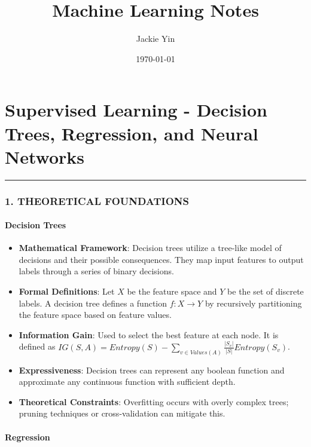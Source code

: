 \documentclass[
  12pt,
]{report}
\title{Machine Learning Notes}
\author{Jackie Yin}
\date{\today}
\providecommand{\tightlist}{%
  \setlength{\itemsep}{0pt}\setlength{\parskip}{0pt}}
\begin{document}
\maketitle

\chapter{Supervised Learning - Decision Trees, Regression, and Neural Networks}

\begin{center}\rule{0.5\linewidth}{0.5pt}\end{center}

\subsection{1. THEORETICAL FOUNDATIONS}\label{theoretical-foundations}

\subsubsection{Decision Trees}\label{decision-trees}

\begin{itemize}
\tightlist
\item
  \textbf{Mathematical Framework}: Decision trees utilize a tree-like model of decisions and their possible consequences. They map input features to output labels through a series of binary decisions.
\item
  \textbf{Formal Definitions}: Let \(X\) be the feature space and \(Y\) be the set of discrete labels. A decision tree defines a function \(f: X \rightarrow Y\) by recursively partitioning the feature space based on feature values.
\item
  \textbf{Information Gain}: Used to select the best feature at each node. It is defined as \(IG(S, A) = Entropy(S) - \sum_{v \in Values(A)} \frac{|S_v|}{|S|} Entropy(S_v)\).
\item
  \textbf{Expressiveness}: Decision trees can represent any boolean function and approximate any continuous function with sufficient depth.
\item
  \textbf{Theoretical Constraints}: Overfitting occurs with overly complex trees; pruning techniques or cross-validation can mitigate this.
\end{itemize}

\subsubsection{Regression}\label{regression}
\end{document}
